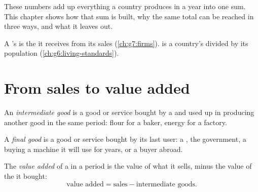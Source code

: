 These numbers add up everything a country produces in a year into one sum. This chapter shows
how that sum is built, why the same total can be reached in three ways, and what it leaves out.

\begin{recall}
A 's  is the  it receives from its sales (\cref{ch:g7:firms}).  is a country's  divided by its population (\cref{ch:g6:living-standards}).
\end{recall}

\section{From sales to value added}

\begin{definition}\label{def:g8:gdp:intermediate-good}
An \emph{intermediate good} is a good or service bought by a  and
used up in producing another good in the same period: flour for a baker, energy for a factory.
\end{definition}

\begin{definition}\label{def:g8:gdp:final-good}
A \emph{final good} is a good or service bought by its last user: a ,
the government, a  buying a machine it will use for years, or a buyer abroad.
\end{definition}

\begin{definition}\label{def:g8:gdp:value-added}
The \emph{value added} of a  in a period is the value of what it sells,
minus the value of the  it bought:
\[
\text{value added} = \text{sales} - \text{intermediate goods}.
\]
\end{definition}


